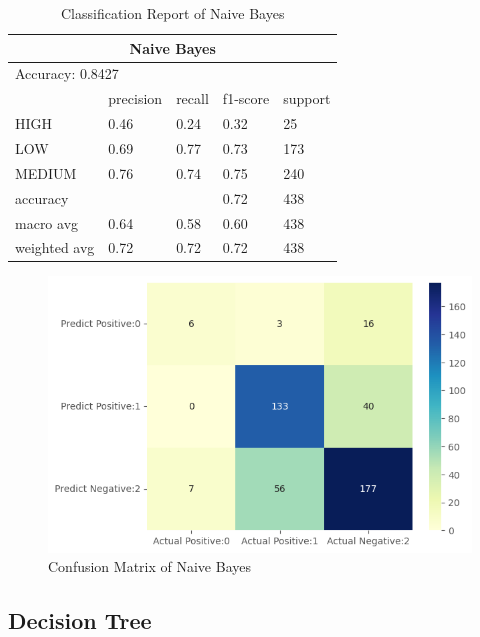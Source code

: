 \begin{table}[H]\centering
    \begin{tabular}{@{}lllll@{}}
    \toprule
    \multicolumn{5}{c}{Naive Bayes}                 \\ \midrule
    \multicolumn{5}{l}{Accuracy: 0.8427}       \\\midrule
                 & precision & recall & f1-score & support \\
    HIGH         & 0.46      & 0.24   & 0.32     & 25      \\ 
    LOW          & 0.69      & 0.77   & 0.73     & 173     \\
    MEDIUM       & 0.76      & 0.74   & 0.75     & 240     \\
    accuracy     &           &        & 0.72     & 438     \\
    macro avg    & 0.64      & 0.58   & 0.60     & 438     \\
    weighted avg & 0.72      & 0.72   & 0.72     & 438     \\ \bottomrule
    \end{tabular}
    \caption{Classification Report of Naive Bayes}
    \label{tablenb}
    \end{table}




\begin{figure}[H]
    \includegraphics[scale=0.7]{imgs/nb_cm}
    \centering
    \caption{Confusion Matrix of Naive Bayes}
    \label{cmnb}
\end{figure}

\subsection{Decision Tree} 

